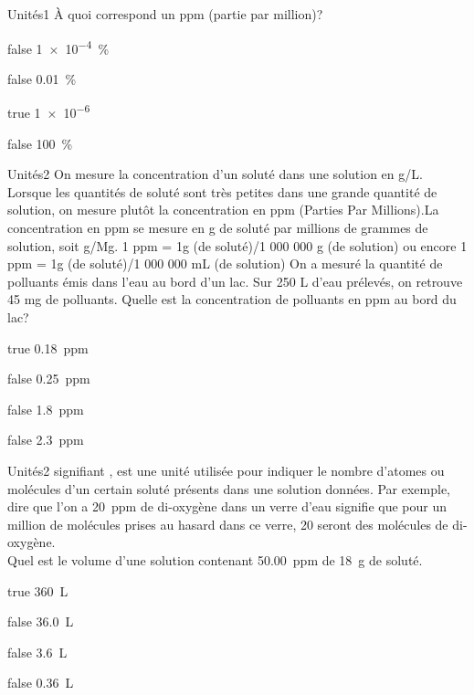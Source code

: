             \begin{question}{}{Unités}{1}{}
                À quoi correspond un \si{ppm} (partie par million)?
            \end{question}
            \begin{reponses} 
                \item[false] \SI{1e-4}{\percent}
                \item[false] \SI{0.01}{\percent}
                \item[true] \num{1e-6}
        	    \item[false] \SI{100}{\percent}
            \end{reponses}
            \begin{question}{}{Unités}{2}{}
                On mesure la concentration d'un soluté dans une solution en g/L. Lorsque les quantités de soluté sont très petites dans une grande quantité de solution, on mesure plutôt la concentration en ppm (Parties Par Millions).La concentration en ppm se mesure en g de soluté par millions de grammes de solution, soit g/Mg.
                1 ppm = 1g (de soluté)/1 000 000 g (de solution) ou encore  1 ppm = 1g (de soluté)/1 000 000 mL (de solution) 
                On a mesuré la quantité de polluants émis dans l'eau au bord d'un lac. Sur 250 L d'eau prélevés, on retrouve 45 mg de polluants. Quelle est la concentration de polluants en ppm au bord du lac? 
            \end{question}
            \begin{reponses} 
                \item[true]   \SI{.18}{ppm}
                \item[false]  \SI{.25}{ppm}
                \item[false]   \SI{1.8}{ppm}
        	    \item[false]  \SI{2.3}{ppm}
            \end{reponses}
            \begin{question}{}{Unités}{2}{}
                 signifiant , est une unité utilisée pour indiquer le nombre d'atomes ou molécules d'un certain soluté présents dans une solution données. Par exemple, dire que l'on a \SI{20}{ppm} de di-oxygène dans un verre d'eau signifie que pour un million de molécules prises au hasard dans ce verre, 20 seront des molécules de di-oxygène.\\
                Quel est le volume d'une solution contenant \SI{50.00}{ppm} de \SI{18}{\gram} de soluté. 
            \end{question}
            \begin{reponses} 
                \item[true]   \SI{360}{\liter}
                \item[false]  \SI{36.0}{\liter}
                \item[false]   \SI{3.6}{\liter}
        	    \item[false]  \SI{0.36}{\liter}
            \end{reponses}
